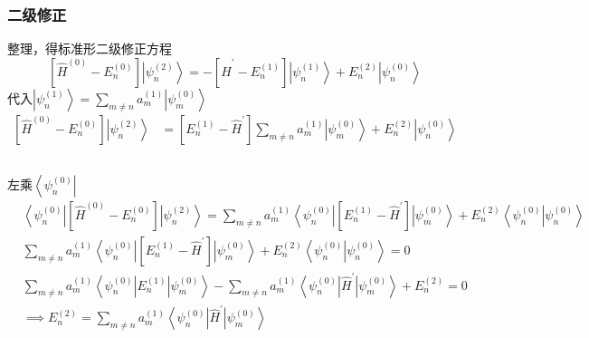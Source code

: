 \begin{frame}
  \frametitle{二级修正}
\解 整理，得标准形二级修正方程
\begin{equation}\label{eq:ejxz}
  \left[\hat{H}^{(0)} - E_n^{(0)}\right]\left|\psi_n^{(2)}\right\rangle
  =-  \left[\hat{H}^{\prime} - E_n^{(1)}\right] \left|\psi_n^{(1)}\right\rangle+E_n^{(2)}\left|\psi_n^{(0)}\right\rangle
\end{equation}
代入$\left|\psi_n^{(1)}\right\rangle = \sum_{m\ne n} a_m^{(1)} \left|\psi_m^{(0)} \right\rangle $
\begin{equation*}
  \begin{aligned}
    \left[\hat{H}^{(0)} - E_n^{(0)}\right]\left|\psi_n^{(2)}\right\rangle
    &= \left[E_n^{(1)}-\hat{H}^{\prime}\right] \sum_{m\ne n} a_m^{(1)} \left|\psi_m^{(0)} \right\rangle+E_n^{(2)}\left|\psi_n^{(0)}\right\rangle \\ 
  \end{aligned}  
\end{equation*}
\end{frame} 

\begin{frame}
  \frametitle{}
  左乘$\left\langle \psi_n^{(0)}\right|$
  \begin{equation*}
    \begin{aligned}
      &\left\langle \psi_n^{(0)}\right|\left[\hat{H}^{(0)} - E_n^{(0)}\right]\left|\psi_n^{(2)}\right\rangle
      = \sum_{m\ne n} a_m^{(1)}\left\langle \psi_n^{(0)}\right|\left[E_n^{(1)}-\hat{H}^{\prime}  \right]  \left|\psi_m^{(0)} \right\rangle
      +E_n^{(2)}\left\langle \psi_n^{(0)}\left|\psi_n^{(0)}\right\rangle \right. \\
      &\sum_{m\ne n} a_m^{(1)}\left\langle \psi_n^{(0)}\right|\left[E_n^{(1)}-\hat{H}^{\prime}  \right]  \left|\psi_m^{(0)} \right\rangle
      +E_n^{(2)}\left\langle \psi_n^{(0)}\left|\psi_n^{(0)}\right\rangle \right. =0  \\
      & \sum_{m\ne n} a_m^{(1)}\left\langle \psi_n^{(0)}\right|E_n^{(1)}  \left|\psi_m^{(0)} \right\rangle - \sum_{m\ne n} a_m^{(1)}\left\langle \psi_n^{(0)}\right|\hat{H}^{\prime} \left|\psi_m^{(0)} \right\rangle +E_n^{(2)} =0 \\ 
      &\implies  E_n^{(2)} = \sum_{m\ne n} a_m^{(1)}\left\langle \psi_n^{(0)}\right|\hat{H}^{\prime} \left|\psi_m^{(0)} \right\rangle \\
    \end{aligned}  
  \end{equation*}
\end{frame} 

